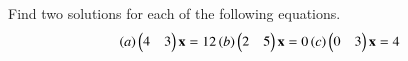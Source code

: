 Find two solutions for each of the following equations.
\begin{align}
\brak{a} \myvec{4&3}\vec{x}=12
\brak{b} \myvec{2&5}\vec{x}=0
\brak{c} \myvec{0&3}\vec{x}=4
\end{align}

